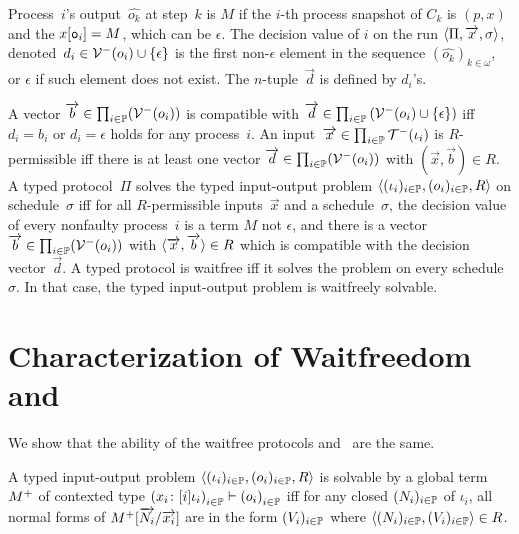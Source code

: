 {

Process~$i$'s output~$\hat{o_k}$ at step~$k$ is
$M$ if the $i$-th process snapshot of $C_k$ is
$(p, x)$ and the $x[\texttt{o}_i] = M$, which can be $\epsilon$.
The decision value of $i$ on the run $\langle{\Pi,\overrightarrow x,\sigma}\rangle$,
denoted~$d_i \in \mathcal{V}^-(o_i)\cup\{\epsilon\}$
 is the first non-$\epsilon$ element in the sequence
 $\left(\hat{o_k}\right)_{k\in\omega}$,
 or
$\epsilon$ if such element does not exist.
The $n$-tuple~$\vec d$ is defined by $d_i$'s.

A vector $\overrightarrow b\in \prod_{i\in \mathbb{P}}(\mathcal{V}^-(o_i))$
is compatible with $\overrightarrow d \in \prod_{i\in
\mathbb{P}}\left(\mathcal{V}^-(o_i)\cup\{\epsilon\}\right)$ iff
$d_i = b_i$ or $d_i = \epsilon$ holds for any process~$i$.
An input~$\overrightarrow x\in \prod_{i\in \mathbb{P}}\mathcal{T}^-(\iota_i)$
is \linebreak[2] $R$-permissible iff there is at least one
vector $\overrightarrow d\in \prod_{i\in \mathbb{P}}(\mathcal{V}^-(o_i))$ with $(\vec x, \vec b)\in R$.
A typed protocol~$\Pi$ solves the typed input-output problem
  $\langle{(\iota_i)_{i\in \mathbb{P}}, (o_i)_{i\in \mathbb{P}}, R}\rangle$ on
schedule~$\sigma$ iff for all $R$-permissible inputs~$\vec x$ and a
schedule~$\sigma$,
 the decision value of every nonfaulty process~$i$ is a term
       $M$ not $\epsilon$, and
 there is a vector $\overrightarrow b\in \prod_{i\in \mathbb{P}}(\mathcal{V}^- (o_i))$
 with $\langle{\overrightarrow x, \overrightarrow b}\rangle \in R$ which is compatible with the
 decision vector~$\vec d$.
 A typed protocol is waitfree iff it solves
 the problem on every schedule~$\sigma$.
 In that case, the typed input-output problem is
 waitfreely solvable.




\section{Characterization of Waitfreedom and \lgd}
\label{comparison}

We show that the ability of the waitfree protocols and \lgd\, are the same.
\begin{definition}
 \label{def:solvable}
 A typed input-output problem
 $\langle{(\iota_i)_{i\in \mathbb{P}}, (o_i)_{i\in \mathbb{P}}, R}\rangle$ is
 solvable by a global term
 ${M}^+$ of contexted type
 $\left({x_i} \colon{[i]\iota_i}\right)_{i\in\mathbb{P}}
 \vdash\left(o_i\right)_{i\in \mathbb{P}}$ iff
 for any closed $(N_i)_{i\in \mathbb{P}}$ of $\iota_i$,
 all normal forms of ${M}^+[\overrightarrow{N_i}/\overrightarrow{x_i}]$
 are in the form $(V_i)_{i\in\mathbb{P}}$
 where $\langle{(N_i)_{i\in \mathbb{P}}, (V_i)_{i\in \mathbb{P}}}\rangle\in R$.
\end{definition}

}
